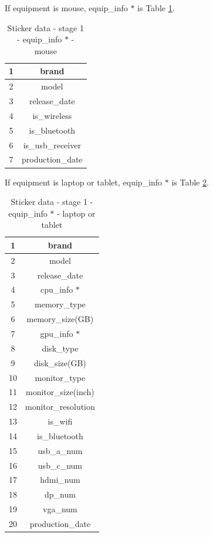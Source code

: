 \documentclass[a4paper,11pt]{article}
\begin{document}
If equipment is mouse, equip\_info $*$ is Table \ref{table:sticker_data_stage_1_equip_info_mouse}.
\begin{table}[h!]
	\begin{center}
		\begin{tabular}{ | c | c | }
			\hline
			1 & brand \\ 
			\hline
			2 & model  \\  
			\hline
			3 & release\_date \\
			\hline
			4 & is\_wireless \\ 
			\hline
			5 &  is\_bluetooth \\  
			\hline
			6 & is\_usb\_receiver \\
			\hline
			7 & production\_date \\
			\hline
		\end{tabular}
		\caption{Sticker data \-- stage 1 \-- equip\_info $*$ \-- mouse}
		\label{table:sticker_data_stage_1_equip_info_mouse}
	\end{center}
\end{table}

If equipment is laptop or tablet, equip\_info $*$ is Table \ref{table:sticker_data_stage_1_equip_info_laptop}.
\begin{table}[h!]
	\begin{center}
		\begin{tabular}{ | c | c | }
			\hline
			1 & brand \\ 
			\hline
			2 & model  \\  
			\hline
			3 & release\_date \\
			\hline
			4 & cpu\_info $*$ \\ 
			\hline
			5 &  memory­\_type \\  
			\hline
			6 & memory\_size(GB) \\
			\hline
			7 & gpu­\_info $*$ \\  
			\hline
			8 & disk\_type \\
			\hline
			9 & disk\_size(GB) \\
			\hline
			10 & monitor­\_type \\  
			\hline
			11 & monitor\_size(inch) \\ 
			\hline
			12 & monitor\_resolution  \\  
			\hline
			13 & is\_wifi \\
			\hline
			14 & is\_bluetooth \\ 
			\hline
			15 & usb\_a\_num \\  
			\hline
			16 & usb\_c\_num \\
			\hline
			17 & hdmi\_num \\
			\hline
			18 & dp\_num \\  
			\hline
			19 & vga\_num \\  
			\hline
			20 & production\_date \\
			\hline
		\end{tabular}
		\caption{Sticker data \-- stage 1 \-- equip\_info $*$ \-- laptop or tablet}
		\label{table:sticker_data_stage_1_equip_info_laptop}
	\end{center}
\end{table}
\end{document}
